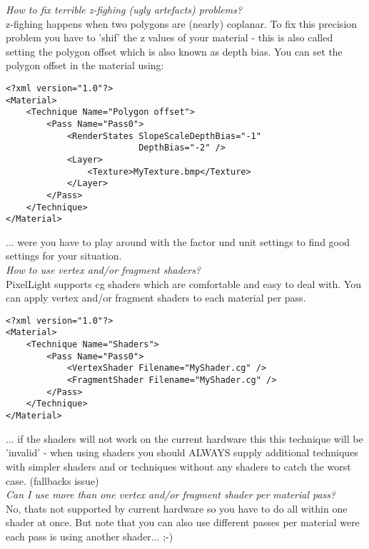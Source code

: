 \emph{How to fix terrible z-fighing (ugly artefacts) problems?}\\
z-fighing happens when two polygons are (nearly) coplanar. To fix this precision problem you have
to 'shif' the z values of your material - this is also called setting the polygon offset which is
also known as depth bias. You can set the polygon offset in the material using:\\

\begin{lstlisting}[caption=Polygon offset]
<?xml version="1.0"?>
<Material>
    <Technique Name="Polygon offset">
        <Pass Name="Pass0">
            <RenderStates SlopeScaleDepthBias="-1" 
                          DepthBias="-2" />
            <Layer>
                <Texture>MyTexture.bmp</Texture>
            </Layer>
        </Pass>
    </Technique>
</Material>
\end{lstlisting}

... were you have to play around with the factor und unit settings to find good settings for your
situation.\\


\emph{How to use vertex and/or fragment shaders?}\\
PixelLight supports cg shaders which are comfortable and easy to deal with. You can apply vertex
and/or fragment shaders to each material per pass.\\

\begin{lstlisting}[caption=Material and shaders]
<?xml version="1.0"?>
<Material>
    <Technique Name="Shaders">
        <Pass Name="Pass0">
            <VertexShader Filename="MyShader.cg" />
            <FragmentShader Filename="MyShader.cg" />
        </Pass>
    </Technique>
</Material>
\end{lstlisting}

... if the shaders will not work on the current hardware this this technique will be 'invalid'
- when using shaders you should ALWAYS supply additional techniques with simpler shaders and or
techniques without any shaders to catch the worst case. (fallbacks issue)\\


\emph{Can I use more than one vertex and/or fragment shader per material pass?}\\
No, thats not supported by current hardware so you have to do all within one shader at once.
But note that you can also use different passes per material were each pass is using another
shader... ;-)\\


